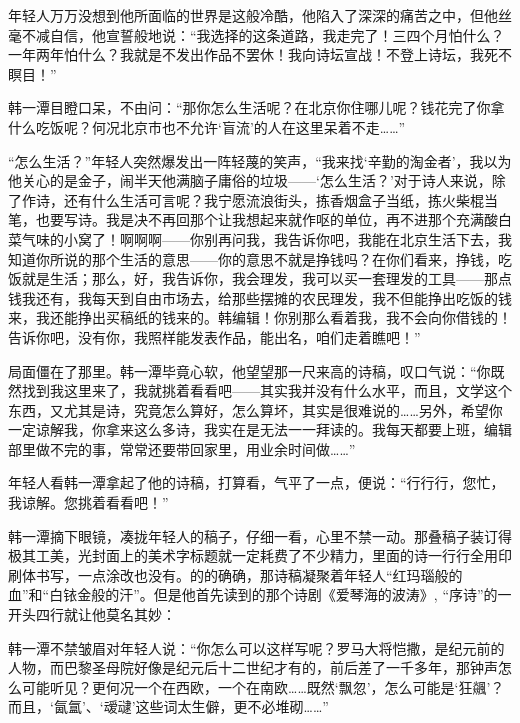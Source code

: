 \par 年轻人万万没想到他所面临的世界是这般冷酷，他陷入了深深的痛苦之中，但他丝毫不减自信，他宣誓般地说：“我选择的这条道路，我走完了！三四个月怕什么？一年两年怕什么？我就是不发出作品不罢休！我向诗坛宣战！不登上诗坛，我死不瞑目！”
\par 韩一潭目瞪口呆，不由问：“那你怎么生活呢？在北京你住哪儿呢？钱花完了你拿什么吃饭呢？何况北京市也不允许‘盲流’的人在这里呆着不走……”
\par “怎么生活？”年轻人突然爆发出一阵轻蔑的笑声，“我来找‘辛勤的淘金者’，我以为他关心的是金子，闹半天他满脑子庸俗的垃圾——‘怎么生活？’对于诗人来说，除了作诗，还有什么生活可言呢？我宁愿流浪街头，拣香烟盒子当纸，拣火柴棍当笔，也要写诗。我是决不再回那个让我想起来就作呕的单位，再不进那个充满酸白菜气味的小窝了！啊啊啊——你别再问我，我告诉你吧，我能在北京生活下去，我知道你所说的那个生活的意思——你的意思不就是挣钱吗？在你们看来，挣钱，吃饭就是生活；那么，好，我告诉你，我会理发，我可以买一套理发的工具——那点钱我还有，我每天到自由市场去，给那些摆摊的农民理发，我不但能挣出吃饭的钱来，我还能挣出买稿纸的钱来的。韩编辑！你别那么看着我，我不会向你借钱的！告诉你吧，没有你，我照样能发表作品，能出名，咱们走着瞧吧！”
\par 局面僵在了那里。韩一潭毕竟心软，他望望那一尺来高的诗稿，叹口气说：“你既然找到我这里来了，我就挑着看看吧——其实我并没有什么水平，而且，文学这个东西，又尤其是诗，究竟怎么算好，怎么算坏，其实是很难说的……另外，希望你一定谅解我，你拿来这么多诗，我实在是无法一一拜读的。我每天都要上班，编辑部里做不完的事，常常还要带回家里，用业余时间做……”
\par 年轻人看韩一潭拿起了他的诗稿，打算看，气平了一点，便说：“行行行，您忙，我谅解。您挑着看看吧！”
\par 韩一潭摘下眼镜，凑拢年轻人的稿子，仔细一看，心里不禁一动。那叠稿子装订得极其工美，光封面上的美术字标题就一定耗费了不少精力，里面的诗一行行全用印刷体书写，一点涂改也没有。的的确确，那诗稿凝聚着年轻人“红玛瑙般的血”和“白铱金般的汗”。但是他首先读到的那个诗剧《爱琴海的波涛》, “序诗”的一开头四行就让他莫名其妙：
\par 韩一潭不禁皱眉对年轻人说：“你怎么可以这样写呢？罗马大将恺撒，是纪元前的人物，而巴黎圣母院好像是纪元后十二世纪才有的，前后差了一千多年，那钟声怎么可能听见？更何况一个在西欧，一个在南欧……既然‘飘忽’，怎么可能是‘狂飊'？而且，‘氤氲’、‘叆叇’这些词太生僻，更不必堆砌……”
